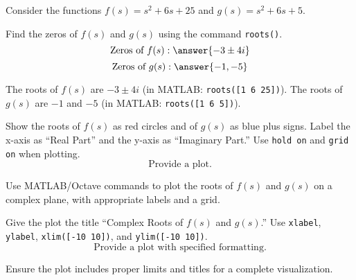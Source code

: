 \documentclass{ximera}
\author{Jont Allen}
\begin{document}
\begin{problem}
    Consider the functions \(f(s) = s^2 + 6s + 25\) and \(g(s) = s^2 + 6s + 5\).
    
    Find the zeros of \(f(s)\) and \(g(s)\) using the command \texttt{roots()}.
    \[
    \text{Zeros of } f(s): \answer{-3 \pm 4i}
    \]
    \[
    \text{Zeros of } g(s): \answer{-1, -5}
    \]
    \begin{feedback}[correct]
    The roots of \(f(s)\) are \(-3 \pm 4i\) (in MATLAB: \texttt{roots([1 6 25])}). The roots of \(g(s)\) are \(-1\) and \(-5\) (in MATLAB: \texttt{roots([1 6 5])}).
    \end{feedback}
\end{problem}

\begin{problem}
    Show the roots of \(f(s)\) as red circles and of \(g(s)\) as blue plus signs.
    Label the x-axis as “Real Part” and the y-axis as “Imaginary Part.” Use \texttt{hold on} and \texttt{grid on} when plotting.
    \[
    \text{Provide a plot.}
    \]
    \begin{feedback}[correct]
    Use MATLAB/Octave commands to plot the roots of \(f(s)\) and \(g(s)\) on a complex plane, with appropriate labels and a grid.
    \end{feedback}
\end{problem}

\begin{problem}
    Give the plot the title “Complex Roots of \(f(s)\) and \(g(s)\).” Use \texttt{xlabel}, \texttt{ylabel}, \texttt{xlim([-10 10])}, and \texttt{ylim([-10 10])}.
    \[
    \text{Provide a plot with specified formatting.}
    \]
    \begin{feedback}[correct]
    Ensure the plot includes proper limits and titles for a complete visualization.
    \end{feedback}
\end{problem}
\end{document}
